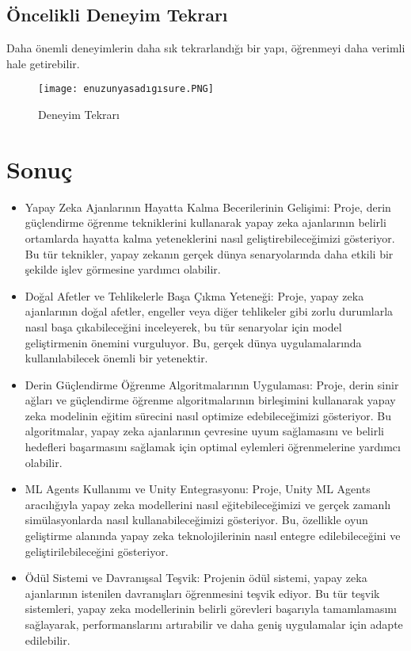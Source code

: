 \documentclass{article}
\begin{document}
\subsection{Öncelikli Deneyim Tekrarı}
Daha önemli deneyimlerin daha sık tekrarlandığı bir yapı, öğrenmeyi daha verimli hale getirebilir.

\begin{figure}[h]
    \centering
    \texttt{[image: enuzunyasadıgısure.PNG]}
    \caption{Deneyim Tekrarı}
    \label{fig:resim29}
    \end{figure}
\section{Sonuç}
\begin{itemize}
\item Yapay Zeka Ajanlarının Hayatta Kalma Becerilerinin Gelişimi: Proje, derin güçlendirme öğrenme tekniklerini kullanarak yapay zeka ajanlarının belirli ortamlarda hayatta kalma yeteneklerini nasıl geliştirebileceğimizi gösteriyor. Bu tür teknikler, yapay zekanın gerçek dünya senaryolarında daha etkili bir şekilde işlev görmesine yardımcı olabilir.

\item Doğal Afetler ve Tehlikelerle Başa Çıkma Yeteneği: Proje, yapay zeka ajanlarının doğal afetler, engeller veya diğer tehlikeler gibi zorlu durumlarla nasıl başa çıkabileceğini inceleyerek, bu tür senaryolar için model geliştirmenin önemini vurguluyor. Bu, gerçek dünya uygulamalarında kullanılabilecek önemli bir yetenektir.

\item Derin Güçlendirme Öğrenme Algoritmalarının Uygulaması: Proje, derin sinir ağları ve güçlendirme öğrenme algoritmalarının birleşimini kullanarak yapay zeka modelinin eğitim sürecini nasıl optimize edebileceğimizi gösteriyor. Bu algoritmalar, yapay zeka ajanlarının çevresine uyum sağlamasını ve belirli hedefleri başarmasını sağlamak için optimal eylemleri öğrenmelerine yardımcı olabilir.

\item ML Agents Kullanımı ve Unity Entegrasyonu: Proje, Unity ML Agents aracılığıyla yapay zeka modellerini nasıl eğitebileceğimizi ve gerçek zamanlı simülasyonlarda nasıl kullanabileceğimizi gösteriyor. Bu, özellikle oyun geliştirme alanında yapay zeka teknolojilerinin nasıl entegre edilebileceğini ve geliştirilebileceğini gösteriyor.

\item Ödül Sistemi ve Davranışsal Teşvik: Projenin ödül sistemi, yapay zeka ajanlarının istenilen davranışları öğrenmesini teşvik ediyor. Bu tür teşvik sistemleri, yapay zeka modellerinin belirli görevleri başarıyla tamamlamasını sağlayarak, performanslarını artırabilir ve daha geniş uygulamalar için adapte edilebilir.


\end{itemize}
\end{document}
